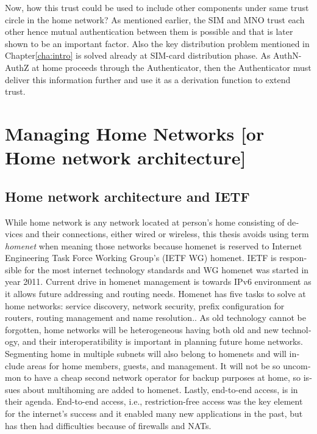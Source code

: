 \documentclass[12pt,a4paper,english]{tutthesis}
\begin{document}
\begin{otherlanguage}{english}
Now, how this trust could be used to include other components under
same trust circle in the home network? As mentioned earlier, the SIM
and MNO trust each other hence mutual authentication between them is
possible and that is later shown to be an important factor.  Also the
key distribution problem mentioned in Chapter\ref{cha:intro} is solved
already at SIM-card distribution phase.  As AuthN-AuthZ at home
proceeds through the Authenticator, then the Authenticator must
deliver this information further and use it as a derivation function
to extend trust.




\chapter{Managing Home Networks [or Home network architecture]}
\label{sec-3}

\section{Home network architecture and IETF}
\label{sec-3-1}


While home network is any network located at person's home consisting
of devices and their connections, either wired or wireless,
this thesis avoids using term \emph{homenet} when meaning those networks
because  homenet  is  reserved to 
Internet Engineering Task Force Working Group's (IETF
WG) homenet. IETF is responsible for the most internet technology standards and 
WG homenet was started in year 2011.
Current drive in homenet management is towards IPv6 environment
 as it allows future addressing and routing needs. 
Homenet has five tasks to solve at home networks: service discovery, network security, 
prefix configuration for routers, routing management and name
resolution.\cite{homenet-charter}.
As old technology cannot be forgotten, home networks will be heterogeneous having both
old and new technology, and their interoperatibility is important in
planning future home networks. 
Segmenting home in multiple subnets will also belong
to homenets and will include areas for home members, guests,
and management. It will not be so uncommon to have a cheap second
network operator for backup purposes at home, so issues about
multihoming are added to homenet.
Lastly, end-to-end access, is in their
agenda. End-to-end access, i.e., restriction-free access was the key
element for the internet's success and it enabled many new
applications in the past, but has then had difficulties because of
firewalls and NATs.




\end{otherlanguage}
\end{document}
